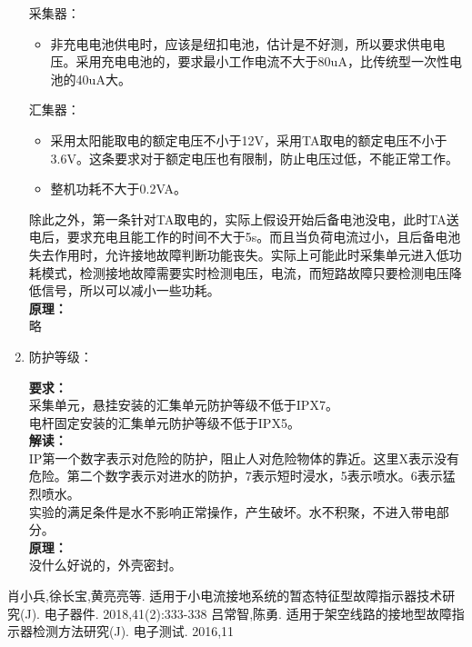 \documentclass{article}
\begin{document}
\begin{CJK}{UTF8}{gbsn}
\begin{enumerate}
	采集器：
	\begin{itemize}
			\item 非充电电池供电时，应该是纽扣电池，估计是不好测，所以要求供电电压。采用充电电池的，要求最小工作电流不大于80uA，比传统型一次性电池的40uA大。
	\end{itemize}
	汇集器：
	\begin{itemize}
			\item 采用太阳能取电的额定电压不小于12V，采用TA取电的额定电压不小于3.6V。这条要求对于额定电压也有限制，防止电压过低，不能正常工作。
			\item 整机功耗不大于0.2VA。
	\end{itemize}
	除此之外，第一条针对TA取电的，实际上假设开始后备电池没电，此时TA送电后，要求充电且能工作的时间不大于5s。而且当负荷电流过小，且后备电池失去作用时，允许接地故障判断功能丧失。实际上可能此时采集单元进入低功耗模式，检测接地故障需要实时检测电压，电流，而短路故障只要检测电压降低信号，所以可以减小一些功耗。\\
	\textbf{原理：}\\
	略
\item 防护等级：
	\par
	\textbf{要求：}\\
	采集单元，悬挂安装的汇集单元防护等级不低于IPX7。\\
	电杆固定安装的汇集单元防护等级不低于IPX5。\\
	\textbf{解读：}\\
	IP第一个数字表示对危险的防护，阻止人对危险物体的靠近。这里X表示没有危险。第二个数字表示对进水的防护，7表示短时浸水，5表示喷水。6表示猛烈喷水。\\
	实验的满足条件是水不影响正常操作，产生破坏。水不积聚，不进入带电部分。\\
	\textbf{原理：}\\
	没什么好说的，外壳密封。
	
	\end{enumerate}
\begin{thebibliography}{99}
肖小兵,徐长宝,黄亮亮等. 适用于小电流接地系统的暂态特征型故障指示器技术研究(J). 电子器件. 2018,41(2):333-338
吕常智,陈勇. 适用于架空线路的接地型故障指示器检测方法研究(J). 电子测试. 2016,11
\end{thebibliography}
\end{CJK}
\end{document}
